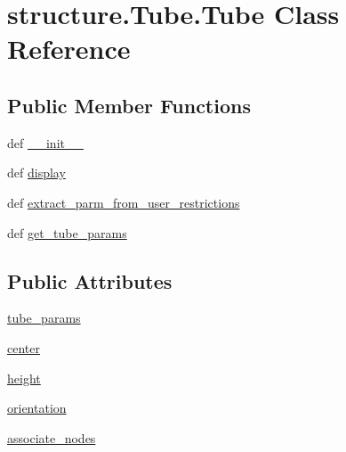 \hypertarget{classstructure_1_1_tube_1_1_tube}{\section{structure.\-Tube.\-Tube Class Reference}
\label{classstructure_1_1_tube_1_1_tube}
}
\subsection*{Public Member Functions}
\begin{DoxyCompactItemize}
\item 
def \hyperlink{classstructure_1_1_tube_1_1_tube_a8c22b97dc4d23e1e22af58c8afe0810d}{\-\_\-\-\_\-init\-\_\-\-\_\-}
\item 
def \hyperlink{classstructure_1_1_tube_1_1_tube_ad248c6ddb9412659d78f2ddfc5dee728}{display}
\item 
def \hyperlink{classstructure_1_1_tube_1_1_tube_ae38a6cfa1b584ccc06760ab6abb39a0e}{extract\-\_\-parm\-\_\-from\-\_\-user\-\_\-restrictions}
\item 
def \hyperlink{classstructure_1_1_tube_1_1_tube_a87038ec9dd350f61c4af8e0d71f3982e}{get\-\_\-tube\-\_\-params}
\end{DoxyCompactItemize}
\subsection*{Public Attributes}
\begin{DoxyCompactItemize}
\item 
\hyperlink{classstructure_1_1_tube_1_1_tube_a806db8e6104a08da48f5c01fcb680090}{tube\-\_\-params}
\item 
\hyperlink{classstructure_1_1_tube_1_1_tube_a37f12c3efdc7cd783cd0236cf26825a4}{center}
\item 
\hyperlink{classstructure_1_1_tube_1_1_tube_ae6c195f51ebedaf313f598bf679f6efe}{height}
\item 
\hyperlink{classstructure_1_1_tube_1_1_tube_a317a98eb11d85717df188e192e64fd14}{orientation}
\item 
\hyperlink{classstructure_1_1_tube_1_1_tube_a21f57d07139cf053c09cd6894f87a92d}{associate\-\_\-nodes}
\end{DoxyCompactItemize}


